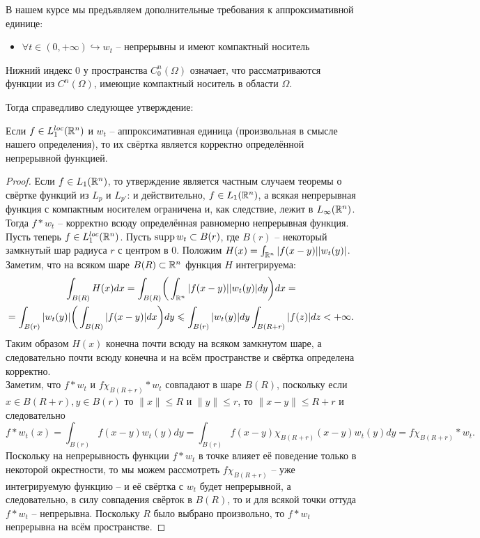\begin{note}
	В нашем курсе мы предъявляем дополнительные требования к аппроксимативной единице:
	\begin{itemize}
		\item $\forall t \in (0, +\infty) \hookrightarrow w_t$ -- непрерывны и имеют компактный носитель
	\end{itemize}
    \begin{definition}
        Нижний индекс $0$ у пространства $C_0^n(\Omega)$ означает, что рассматриваются функции из $C^n(\Omega)$, имеющие компактный носитель в области $\Omega$. 
    \end{definition}
    
	Тогда справедливо следующее утверждение:
	\begin{theorem}
		Если $f \in L_1^{loc}(\mathbb{R}^n)$ и $w_t$ -- аппроксимативная единица (произвольная в смысле нашего определения), то их свёртка является корректно определённой непрерывной функцией.
	\end{theorem}
	\begin{proof}
		Если $f \in L_1(\mathbb{R}^n)$, то утверждение является частным случаем теоремы о свёртке функций из $L_p$ и $L_{p'}$: и действительно, $f \in L_1(\mathbb{R}^n)$, а всякая непрерывная функция с компактным носителем ограничена и, как следствие, лежит в $L_{\infty}(\mathbb{R}^n)$.
		Тогда $f * w_t$ -- корректно всюду определённая равномерно непрерывная функция. \\
		Пусть теперь $f \in L_1^{loc}(\mathbb{R}^n)$.
		Пусть $\operatorname{supp} w_t \subset B(r)$, где $B(r)$ -- некоторый замкнутый шар радиуса $r$ с центром в 0.
		Положим $H(x) = \int_{\mathbb{R}^n}|f(x - y)||w_t(y)|$.
		Заметим, что на всяком шаре $B(R) \subset \mathbb{R}^{n}$ функция $H$ интегрируема:
		\begin{multline*}
			\int_{B(R)} H(x)dx = \int_{B(R)} \biggr(\int_{\mathbb{R}^n}|f(x - y)||w_t(y)|dy\biggr)dx = \\ = \int_{B(r)} |w_t(y)| \biggr(\int_{B(R)} |f(x - y)|dx \biggr) dy \leqslant \int_{B(r)} |w_t(y)|dy \int_{B(R + r)} |f(z)|dz < +\infty.
		\end{multline*}
		Таким образом $H(x)$ конечна почти всюду на всяком замкнутом шаре, а следовательно почти всюду конечна и на всём пространстве и свёртка определена корректно. \\
		Заметим, что $f * w_t$ и $f\chi_{B(R + r)} * w_t$ совпадают в шаре $B(R)$, поскольку если $x \in B(R + r), y \in B(r)$ то $\|x\| \leq R$ и $\|y\| \leq r$, то $\|x - y\| \leq R + r$ и следовательно
		\[
		f * w_t(x) = \int_{B(r)} f(x - y)w_t(y)dy = \int_{B(r)} f(x - y)\chi_{B(R + r)}(x - y)w_t(y)dy = f\chi_{B(R + r)} * w_t.
		\]
		Поскольку на непрерывность функции $f * w_t$ в точке влияет её поведение только в некоторой окрестности, то мы можем рассмотреть $f\chi_{B(R + r)}$ -- уже интегрируемую функцию -- и её свёртка с $w_t$ будет непрерывной, а следовательно, в силу совпадения свёрток в $B(R)$, то и для всякой точки оттуда $f * w_t$ -- непрерывна.
		Поскольку $R$ было выбрано произвольно, то $f * w_t$ непрерывна на всём пространстве.
	\end{proof}
\end{note}

